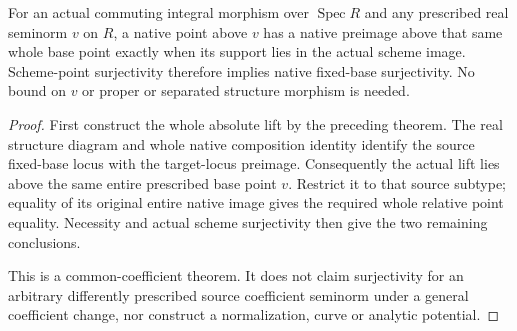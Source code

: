\begin{theorem}
\label{scheme:relative-integral-native-image}
\leanok
{}
For an actual commuting integral morphism over $\operatorname{Spec}R$
and any prescribed real seminorm $v$ on $R$, a native point above $v$
has a native preimage above that same whole base point exactly when its
support lies in the actual scheme image. Scheme-point surjectivity
therefore implies native fixed-base surjectivity. No bound on $v$ or
proper or separated structure morphism is needed.
\end{theorem}
\begin{proof}
First construct the whole absolute lift by the preceding theorem.
The real structure diagram and whole native composition identity
identify the source fixed-base locus with the target-locus preimage.
Consequently the actual lift lies above the same entire prescribed
base point $v$. Restrict it to that source subtype; equality of its
original entire native image gives the required whole relative point
equality. Necessity and actual scheme surjectivity then give the two
remaining conclusions.

This is a common-coefficient theorem. It does not claim surjectivity
for an arbitrary differently prescribed source coefficient seminorm
under a general coefficient change, nor construct a normalization,
curve or analytic potential.
\end{proof}

